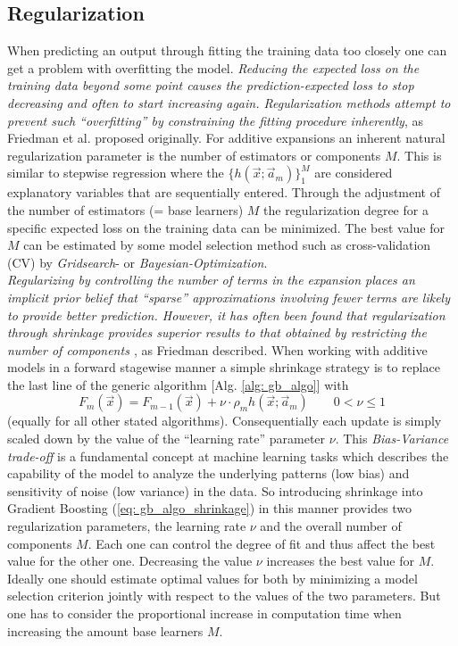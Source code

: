 \documentclass[12pt, a4paper]{article}
\begin{document}
\subsection{Regularization}
When predicting an output through fitting the training data too closely one can get a problem with overfitting the model. \textit{Reducing the expected loss on the training data beyond some point causes the prediction-expected loss to stop decreasing and often to start increasing again.
Regularization methods attempt to prevent such ``overfitting'' by constraining the fitting procedure inherently}, as Friedman et al. \cite{Friedman2001} proposed originally.
For additive expansions an inherent natural regularization parameter is the number of estimators or components $M$. This is similar to stepwise regression where the $\{h(\vec{x};\vec{a}_m)\}_1^M$ are considered explanatory variables that are sequentially entered. Through the adjustment of the number of estimators (= base learners) $M$ the regularization degree for a specific expected loss on the training data can be minimized. The best value for $M$ can be estimated by some model selection method such as cross-validation (CV) by \textit{Gridsearch}- or \textit{Bayesian-Optimization}. \\
\textit{Regularizing by controlling the number of terms in the expansion places an
implicit prior belief that ``sparse'' approximations involving fewer terms are
likely to provide better prediction. However, it has often been found that regularization through shrinkage provides superior results to that obtained by restricting the number of components \cite{Copas1997}}, as Friedman \cite{Friedman2001} described.
When working with additive models in a forward stagewise manner a simple shrinkage strategy is to replace the last line of the generic algorithm [Alg. \ref{alg: gb_algo}] with
\begin{equation}
    \label{eq: gb_algo_shrinkage}
    F_m(\vec{x}) = F_{m-1}(\vec{x}) + \nu \cdot \rho_{m} h(\vec{x};\vec{a}_m) \qquad 0 < \nu \leq 1
\end{equation}
(equally for all other stated algorithms). Consequentially each update is simply scaled down by the value of the ``learning rate'' parameter $\nu$. This \textit{Bias-Variance trade-off} is a fundamental concept at machine learning tasks which describes the capability of the model to analyze the underlying patterns (low bias) and sensitivity of noise (low variance) in the data. So introducing shrinkage into Gradient Boosting (\ref{eq: gb_algo_shrinkage}) in this manner provides two regularization parameters, the learning rate $\nu$ and the overall number of components $M$. Each one can control the degree of fit and thus affect the best value for the other one. Decreasing the value $\nu$ increases the best value for $M$. Ideally one should estimate optimal values for both by minimizing a model selection criterion jointly with respect to the values of the two parameters. But one has to consider the proportional increase in computation time when increasing the amount base learners $M$.
\newpage
\end{document}
